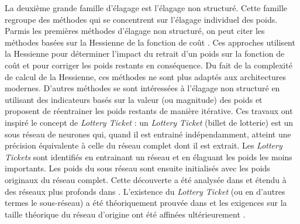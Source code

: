 La deuxième grande famille d'élagage est l'élagage non structuré. Cette famille
regroupe des méthodes qui se concentrent sur l'élagage individuel des poids.
Parmis les premières méthodes d'élagage non structuré, on peut citer les
méthodes basées sur la Hessienne de la fonction de coût
\cite{DBLP:conf/nips/CunDS89,DBLP:conf/icnn/HassibiSW93}. Ces approches
utilisent la Hessienne pour déterminer l'impact du retrait d'un poids sur la
fonction de coût et pour corriger les poids restants en conséquence. Du fait de
la complexité de calcul de la Hessienne, ces méthodes ne sont plus adaptés aux
architectures modernes. D'autres méthodes se sont intéressées à l'élagage non
structuré en utilisant des indicateurs basés sur la valeur (ou magnitude) des
poids \cite{DBLP:conf/nips/HanPTD15} et proposent de réentrainer les poids
restants de manière itérative. Ces travaux ont inspiré le concept de
\emph{Lottery Ticket} \cite{DBLP:journals/corr/abs-1903-01611}: un \emph{Lottery
  Ticket} (billet de lotterie) est un sous réseau de neurones qui, quand il est
entrainé indépendamment, atteint une précision équivalente à celle du réseau
complet dont il est extrait. Les \emph{Lottery Tickets} sont identifiés en
entrainant un réseau et en élaguant les poids les moins importants. Les poids du
sous réseau sont ensuite initialisés avec les poids originaux du réseau complet.
Cette découverte a été analysée dans \cite{DBLP:conf/nips/ZhouLLY19} et étendu à
des réseaux plus profonds dans \cite{DBLP:journals/corr/abs-1903-01611}.
L'existence du \emph{Lottery Ticket} (ou en d'autres termes le sous-réseau) a
été théoriquement prouvée dans \cite{DBLP:conf/icml/MalachYSS20} et les
exigences sur la taille théorique du réseau d'origine ont été affinées
ultérieurement \cite{DBLP:conf/nips/PensiaRNVP20,DBLP:conf/nips/OrseauHR20}.


